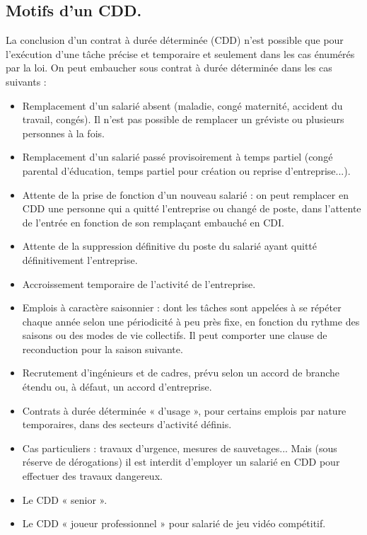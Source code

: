 \subsection{Motifs d'un CDD.}
	La conclusion d’un contrat à durée déterminée (CDD) n’est possible que pour l’exécution d’une tâche précise et temporaire et seulement dans les cas énumérés par la loi.
	On peut embaucher sous contrat à durée déterminée dans les cas suivants :
	\begin{itemize}
		\item[\textbullet] Remplacement d’un salarié absent (maladie, congé maternité, accident du travail, congés). Il n'est pas possible de remplacer un gréviste ou plusieurs personnes à la fois.
		\item[\textbullet] Remplacement d’un salarié passé provisoirement à temps partiel (congé parental d’éducation, temps partiel pour création ou reprise d’entreprise...).
		\item[\textbullet] Attente de la prise de fonction d’un nouveau salarié : on peut remplacer en CDD une personne qui a quitté l'entreprise ou changé de poste, dans l’attente de l’entrée en fonction de son remplaçant embauché en CDI.
		\item[\textbullet] Attente de la suppression définitive du poste du salarié ayant quitté définitivement l’entreprise.
		\item[\textbullet] Accroissement temporaire de l’activité de l’entreprise.
		\item[\textbullet] Emplois à caractère saisonnier : dont les tâches sont appelées à se répéter chaque année selon une périodicité à peu près fixe, en fonction du rythme des saisons ou des modes de vie collectifs.
			Il peut comporter une clause de reconduction pour la saison suivante.
		\item[\textbullet] Recrutement d’ingénieurs et de cadres, prévu selon un accord de branche étendu ou, à défaut, un accord d’entreprise.
		\item[\textbullet] Contrats à durée déterminée « d’usage », pour certains emplois par nature temporaires, dans des secteurs d'activité définis.
		\item[\textbullet] Cas particuliers : travaux d'urgence, mesures de sauvetages... Mais (sous réserve de dérogations) il est interdit d’employer un salarié en CDD pour effectuer des travaux dangereux.
		\item[\textbullet] Le CDD « senior ».
		\item[\textbullet] Le CDD « joueur professionnel » pour salarié de jeu vidéo compétitif.
	\end{itemize}

